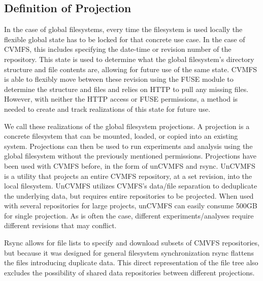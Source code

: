 \documentclass[sigconf]{acmart}
\begin{document}
\subsection{Definition of Projection}

In the case of global filesystems,
every time the filesystem is used locally
the flexible global state has to be 
locked for that concrete use case.
In the case of CVMFS,
this includes specifying the date-time
or revision number of the repository.
This state is used to determine 
what the global filesystem's directory
structure and file contents are, 
allowing for future use of the same state.
CVMFS is able to flexibly move
between these revision using the FUSE module
to determine the structure and files and
relies on HTTP to pull any missing files.
However, with neither the HTTP access or
FUSE permissions, a method is needed to 
create and track realizations of this
state for future use.

We call these realizations of the global filesystem
projections.
A projection is a concrete filesystem that can be
mounted, loaded, or copied into an existing system.
Projections can then be used to run experiments
and analysis using the global filesystem without
the previously mentioned permissions.
Projections have been used with CVMFS before,
in the form of unCVMFS and rsync.
UnCVMFS is a utility that projects an entire
CVMFS repository, at a set revision, into the local
filesystem. 
UnCVMFS utilizes CVMFS's data/file separation
to deduplicate the underlying data, but requires
entire repositories to be projected.
When used with several repositories for large projects,
unCVMFS can easily consume 500GB for single projection.
As is often the case, different experiments/analyses 
require different revisions that may conflict.

Rsync allows for file lists to specify and download
subsets of CMVFS repositories, but because it
was designed for general filesystem synchronization
rsync flattens the files introducing duplicate data.
This direct representation of the file tree also
excludes the possibility of shared data repositories
between different projections.

\end{document}
